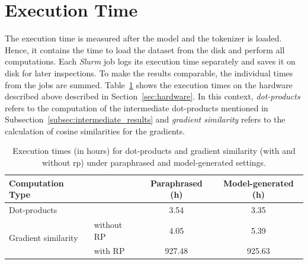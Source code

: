 \section{Execution Time}
The execution time is measured after the model and the tokenizer is loaded. Hence, it contains the time to load the dataset from the disk and perform all computations. Each \emph{Slurm} job logs its execution time separately and saves it on disk for later inspections. To make the results comparable, the individual times from the jobs are summed. Table~\ref{tab:execution_times} shows the execution times on the hardware described above described in Section~\ref{sec:hardware}. In this context, \emph{dot-products} refers to the computation of the intermediate dot-products mentioned in Subsection~\ref{subsec:intermediate_results} and \emph{gradient similarity} refers to the calculation of cosine similarities for the gradients. 
\begin{table}[htb]
    \centering
    \begin{tabular}{|l l|c|c|}
        \hline
        \textbf{Computation Type} & & \textbf{Paraphrased (h)} & \textbf{Model-generated (h)} \\
        \hline
        Dot-products & & 3.54 & 3.35 \\
        \hline
        \multirow{2}{*}{Gradient similarity} 
            & without RP & 4.05 & 5.39 \\
            & with RP & 927.48 & 925.63 \\
        \hline
    \end{tabular}
    \caption{Execution times (in hours) for dot-products and gradient similarity (with and without \acrfull{rp}) under paraphrased and model-generated settings.}
    \label{tab:execution_times}
\end{table}

